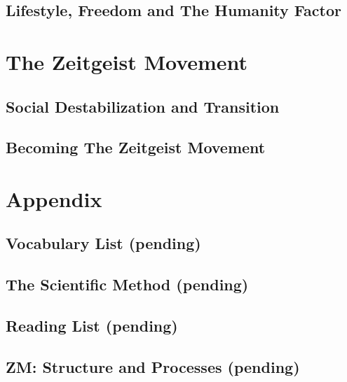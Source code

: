\documentclass[10pt, a4paper, cleardoubleempty, openright, twoside]{book}
\begin{document}
\chapter {Lifestyle, Freedom and The Humanity Factor}


\part {The Zeitgeist Movement \label{part:zeitgeistMovement}}
\chapter {Social Destabilization and Transition}
\chapter {Becoming The Zeitgeist Movement}

\part {Appendix}
\chapter {Vocabulary List (pending)}
\chapter {The Scientific Method (pending)}
\chapter {Reading List (pending)}
\chapter {ZM: Structure and Processes (pending)}




\end{document}
